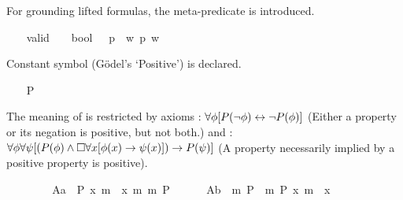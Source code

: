\begin{isabellebody}
\begin{isamarkuptext}%
For grounding lifted formulas, the meta-predicate  is introduced.%
\end{isamarkuptext}%
\isamarkuptrue%
\ \ \isamarkupfalse%
\ valid\ {\isacharcolon}{\isacharcolon}\ {\isachardoublequoteopen}{\isasymsigma}\ {\isasymRightarrow}\ bool{\isachardoublequoteclose}\ {\isacharparenleft}{\isachardoublequoteopen}{\isacharbrackleft}{\isacharunderscore}{\isacharbrackright}{\isachardoublequoteclose}{\isacharparenright}\ \ {\isachardoublequoteopen}{\isacharbrackleft}p{\isacharbrackright}\ {\isasymequiv}\ {\isasymforall}w{\isachardot}\ p\ w{\isachardoublequoteclose}%
\isamarkuptrue%
%
\begin{isamarkuptext}%
Constant symbol  (G\"odel's `Positive') is declared.%
\end{isamarkuptext}%
\isamarkuptrue%
\ \ \isamarkupfalse%
\ P\ {\isacharcolon}{\isacharcolon}\ {\isachardoublequoteopen}{\isacharparenleft}{\isasymmu}\ {\isasymRightarrow}\ {\isasymsigma}{\isacharparenright}\ {\isasymRightarrow}\ {\isasymsigma}{\isachardoublequoteclose}%
\begin{isamarkuptext}%
The meaning of  is restricted by axioms : $\forall \phi 
[P(\neg \phi) \leftrightarrow \neg P(\phi)]$ (Either a property or its negation is positive, but not both.) 
and : $\forall \phi \forall \psi [(P(\phi) \wedge \Box \forall x [\phi(x) \rightarrow \psi(x)]) 
\rightarrow P(\psi)]$ (A property necessarily implied by a positive property is positive).%
\end{isamarkuptext}%
\isamarkuptrue%
\ \ \isamarkupfalse%
\ \isanewline
\ \ \ \ A{}a{\isacharcolon}\ {\isachardoublequoteopen}{\isacharbrackleft}{\isasymforall}{\isacharparenleft}{\isasymlambda}{\isasymPhi}{\isachardot}\ P\ {\isacharparenleft}{\isasymlambda}x{\isachardot}\ m{\isasymnot}\ {\isacharparenleft}{\isasymPhi}\ x{\isacharparenright}{\isacharparenright}\ m{\isasymrightarrow}\ m{\isasymnot}\ {\isacharparenleft}P\ {\isasymPhi}{\isacharparenright}{\isacharparenright}{\isacharbrackright}{\isachardoublequoteclose}\ \isanewline
\ \ \ \ A{}b{\isacharcolon}\ {\isachardoublequoteopen}{\isacharbrackleft}{\isasymforall}{\isacharparenleft}{\isasymlambda}{\isasymPhi}{\isachardot}\ m{\isasymnot}\ {\isacharparenleft}P\ {\isasymPhi}{\isacharparenright}\ m{\isasymrightarrow}\ P\ {\isacharparenleft}{\isasymlambda}x{\isachardot}\ m{\isasymnot}\ {\isacharparenleft}{\isasymPhi}\ x{\isacharparenright}{\isacharparenright}{\isacharparenright}{\isacharbrackright}{\isachardoublequoteclose}\ \isanewline

\end{isabellebody}
